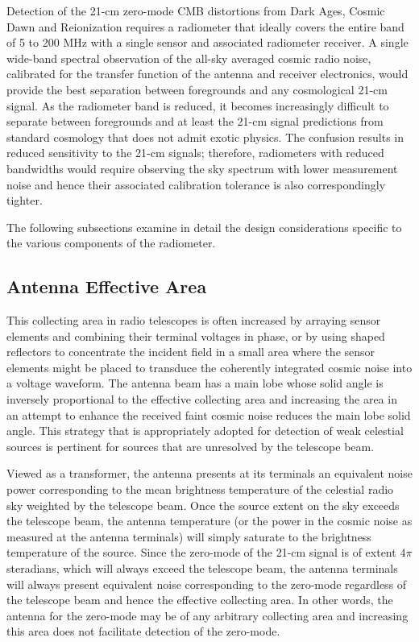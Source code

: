 Detection of the 21-cm zero-mode CMB distortions from Dark Ages, Cosmic Dawn and Reionization requires a radiometer that ideally covers the entire band of 5 to 200 MHz with a single sensor and associated radiometer receiver.  A single wide-band spectral observation of the all-sky averaged cosmic radio noise, calibrated for the transfer function of the antenna and receiver electronics, would provide the best separation between foregrounds and any cosmological 21-cm signal.  As the radiometer band is reduced, it becomes increasingly difficult to separate between foregrounds and at least the 21-cm signal predictions from standard cosmology that does not admit exotic physics.  The confusion results in reduced sensitivity to the 21-cm signals; therefore, radiometers with reduced bandwidths would require observing the sky spectrum with lower measurement noise and hence their associated calibration tolerance is also correspondingly tighter.

The following subsections examine in detail the design considerations specific to the various components of the radiometer.



\subsection{Antenna Effective Area}
  
   This collecting area in radio telescopes is often increased by arraying sensor elements and combining their terminal voltages in phase, or by using shaped reflectors to concentrate the incident field in a small area where the sensor elements might be placed to transduce the coherently integrated cosmic noise into a voltage waveform.  The antenna beam has a main lobe whose solid angle is inversely proportional to the effective collecting area and increasing the area in an attempt to enhance the received faint cosmic noise reduces the main lobe solid angle.  This strategy that is appropriately adopted for detection of weak celestial sources is pertinent for sources that are unresolved by the telescope beam.  
   
   Viewed as a transformer, the antenna presents at its terminals an equivalent noise power corresponding to the mean brightness temperature of the celestial radio sky weighted by the telescope beam.  Once the source extent on the sky exceeds the telescope beam, the antenna temperature (or the power in the cosmic noise as measured at the antenna terminals) will simply saturate to the brightness temperature of the source.  Since the zero-mode of the 21-cm signal is of extent $4\pi$ steradians, which will always exceed the telescope beam, the antenna terminals will always present equivalent noise corresponding to the zero-mode regardless of the telescope beam and hence the effective collecting area.  In other words, the antenna for the zero-mode may be of any arbitrary collecting area and increasing this area does not facilitate detection of the zero-mode.
   
